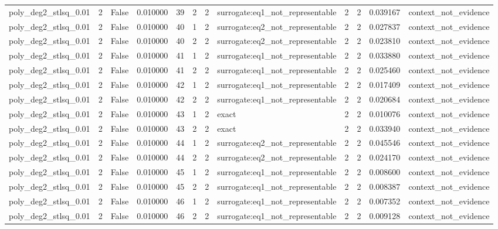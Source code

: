 \begin{tabular}{lrrrrrrlrrrl}
poly\_deg2\_stlsq\_0.01 & 2 & False & 0.010000 & 39 & 2 & 2 & surrogate:eq1\_not\_representable & 2 & 2 & 0.039167 & context\_not\_evidence \\
poly\_deg2\_stlsq\_0.01 & 2 & False & 0.010000 & 40 & 1 & 2 & surrogate:eq2\_not\_representable & 2 & 2 & 0.027837 & context\_not\_evidence \\
poly\_deg2\_stlsq\_0.01 & 2 & False & 0.010000 & 40 & 2 & 2 & surrogate:eq2\_not\_representable & 2 & 2 & 0.023810 & context\_not\_evidence \\
poly\_deg2\_stlsq\_0.01 & 2 & False & 0.010000 & 41 & 1 & 2 & surrogate:eq1\_not\_representable & 2 & 2 & 0.033880 & context\_not\_evidence \\
poly\_deg2\_stlsq\_0.01 & 2 & False & 0.010000 & 41 & 2 & 2 & surrogate:eq1\_not\_representable & 2 & 2 & 0.025460 & context\_not\_evidence \\
poly\_deg2\_stlsq\_0.01 & 2 & False & 0.010000 & 42 & 1 & 2 & surrogate:eq1\_not\_representable & 2 & 2 & 0.017409 & context\_not\_evidence \\
poly\_deg2\_stlsq\_0.01 & 2 & False & 0.010000 & 42 & 2 & 2 & surrogate:eq1\_not\_representable & 2 & 2 & 0.020684 & context\_not\_evidence \\
poly\_deg2\_stlsq\_0.01 & 2 & False & 0.010000 & 43 & 1 & 2 & exact & 2 & 2 & 0.010076 & context\_not\_evidence \\
poly\_deg2\_stlsq\_0.01 & 2 & False & 0.010000 & 43 & 2 & 2 & exact & 2 & 2 & 0.033940 & context\_not\_evidence \\
poly\_deg2\_stlsq\_0.01 & 2 & False & 0.010000 & 44 & 1 & 2 & surrogate:eq2\_not\_representable & 2 & 2 & 0.045546 & context\_not\_evidence \\
poly\_deg2\_stlsq\_0.01 & 2 & False & 0.010000 & 44 & 2 & 2 & surrogate:eq2\_not\_representable & 2 & 2 & 0.024170 & context\_not\_evidence \\
poly\_deg2\_stlsq\_0.01 & 2 & False & 0.010000 & 45 & 1 & 2 & surrogate:eq1\_not\_representable & 2 & 2 & 0.008600 & context\_not\_evidence \\
poly\_deg2\_stlsq\_0.01 & 2 & False & 0.010000 & 45 & 2 & 2 & surrogate:eq1\_not\_representable & 2 & 2 & 0.008387 & context\_not\_evidence \\
poly\_deg2\_stlsq\_0.01 & 2 & False & 0.010000 & 46 & 1 & 2 & surrogate:eq1\_not\_representable & 2 & 2 & 0.007352 & context\_not\_evidence \\
poly\_deg2\_stlsq\_0.01 & 2 & False & 0.010000 & 46 & 2 & 2 & surrogate:eq1\_not\_representable & 2 & 2 & 0.009128 & context\_not\_evidence \\

\end{tabular}
